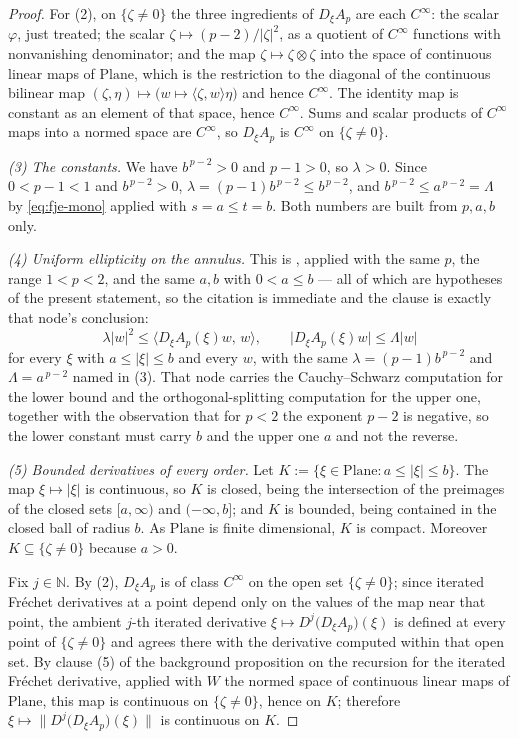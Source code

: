 \begin{proof}
For (2), on $\{\zeta\ne0\}$ the three ingredients of $D_\xi A_p$ are each $C^{\infty}$: the
scalar $\varphi$, just treated; the scalar
$\zeta\mapsto(p-2)/\lvert\zeta\rvert^{2}$, as a quotient of $C^{\infty}$ functions with
nonvanishing denominator; and the map $\zeta\mapsto\zeta\otimes\zeta$ into the space of
continuous linear maps of $\mathrm{Plane}$, which is the restriction to the diagonal of the
continuous bilinear map $(\zeta,\eta)\mapsto\bigl(w\mapsto\langle\zeta,w\rangle\eta\bigr)$ and
hence $C^{\infty}$.  The identity map is constant as an element of that space, hence
$C^{\infty}$.  Sums and scalar products of $C^{\infty}$ maps into a normed space are
$C^{\infty}$, so $D_\xi A_p$ is $C^{\infty}$ on $\{\zeta\ne0\}$.

\medskip\noindent\emph{(3) The constants.}
We have $b^{\,p-2}>0$ and $p-1>0$, so $\lambda>0$.  Since $0<p-1<1$ and $b^{\,p-2}>0$,
$\lambda=(p-1)b^{\,p-2}\le b^{\,p-2}$, and $b^{\,p-2}\le a^{\,p-2}=\Lambda$ by
\eqref{eq:fje-mono} applied with $s=a\le t=b$.  Both numbers are built from $p,a,b$ only.

\medskip\noindent\emph{(4) Uniform ellipticity on the annulus.}
This is , applied with the same $p$, the range
$1<p<2$, and the same $a,b$ with $0<a\le b$ --- all of which are hypotheses of the present
statement, so the citation is immediate and the clause is exactly that node's conclusion:
\[
  \lambda\lvert w\rvert^{2}\le\bigl\langle D_\xi A_p(\xi)w,\,w\bigr\rangle,
  \qquad
  \bigl\lvert D_\xi A_p(\xi)w\bigr\rvert\le\Lambda\lvert w\rvert
\]
for every $\xi$ with $a\le\lvert\xi\rvert\le b$ and every $w$, with the same
$\lambda=(p-1)b^{\,p-2}$ and $\Lambda=a^{\,p-2}$ named in (3).  That node carries the
Cauchy--Schwarz computation for the lower bound and the orthogonal-splitting computation for
the upper one, together with the observation that for $p<2$ the exponent $p-2$ is negative, so
the lower constant must carry $b$ and the upper one $a$ and not the reverse.

\medskip\noindent\emph{(5) Bounded derivatives of every order.}
Let $K:=\{\xi\in\mathrm{Plane}:a\le\lvert\xi\rvert\le b\}$.  The map
$\xi\mapsto\lvert\xi\rvert$ is continuous, so $K$ is closed, being the intersection of the
preimages of the closed sets $[a,\infty)$ and $(-\infty,b]$; and $K$ is bounded, being
contained in the closed ball of radius $b$.  As $\mathrm{Plane}$ is finite dimensional, $K$ is
compact.  Moreover $K\subseteq\{\zeta\ne0\}$ because $a>0$.

Fix $j\in\mathbb{N}$.  By (2), $D_\xi A_p$ is of class $C^{\infty}$ on the open set
$\{\zeta\ne0\}$; since iterated Fr\'echet derivatives at a point depend only on the values of
the map near that point, the ambient $j$-th iterated derivative
$\xi\mapsto D^{j}\bigl(D_\xi A_p\bigr)(\xi)$ is defined at every point of $\{\zeta\ne0\}$ and
agrees there with the derivative computed within that open set.  By clause (5) of the
background proposition on the recursion for the iterated Fr\'echet derivative, applied with
$W$ the normed space of continuous linear maps of $\mathrm{Plane}$, this map is continuous on
$\{\zeta\ne0\}$, hence on $K$; therefore
$\xi\mapsto\bigl\lVert D^{j}\bigl(D_\xi A_p\bigr)(\xi)\bigr\rVert$ is continuous on $K$.


\end{proof}
